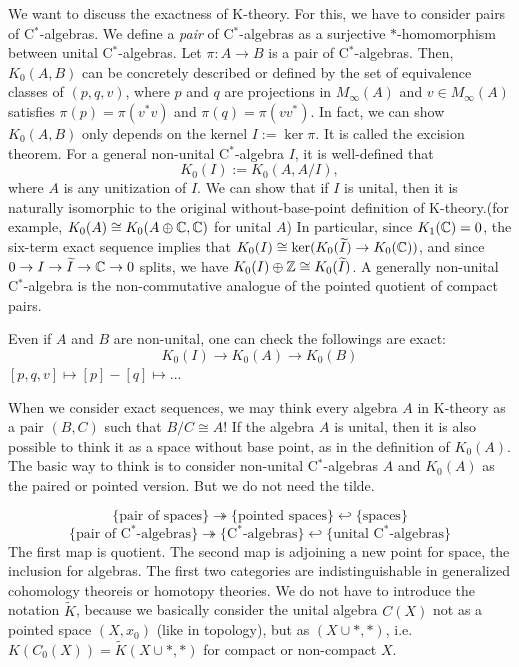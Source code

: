 \documentclass{../../large}
\begin{document}
\begin{prb}
We want to discuss the exactness of K-theory.
For this, we have to consider pairs of C$^*$-algebras.
We define a \emph{pair} of C$^*$-algebras as a surjective $*$-homomorphism between unital C$^*$-algebras.
Let $\pi:A\to B$ is a pair of C$^*$-algebras.
Then, $K_0(A,B)$ can be concretely described or defined by the set of equivalence classes of $(p,q,v)$, where $p$ and $q$ are projections in $M_\infty(A)$ and $v\in M_\infty(A)$ satisfies $\pi(p)=\pi(v^*v)$ and $\pi(q)=\pi(vv^*)$.
In fact, we can show $K_0(A,B)$ only depends on the kernel $I:=\ker\pi$.
It is called the excision theorem.
For a general non-unital C$^*$-algebra $I$, it is well-defined that
\[K_0(I):=K_0(A,A/I),\]
where $A$ is any unitization of $I$.
We can show that if $I$ is unital, then it is naturally isomorphic to the original without-base-point definition of K-theory.(for example, $K_0(A)\cong K_0(A\oplus\mathbb{C},\mathbb{C})$ for unital $A$)
In particular, since $K_1(\mathbb{C})=0$, the six-term exact sequence implies that $K_0(I)\cong\ker(K_0(\widetilde I)\to K_0(\mathbb{C}))$, and since $0\to I\to\widetilde I\to\mathbb{C}\to0$ splits, we have $K_0(I)\oplus\mathbb{Z}\cong K_0(\widetilde I)$.
A generally non-unital C$^*$-algebra is the non-commutative analogue of the pointed quotient of compact pairs.


Even if $A$ and $B$ are non-unital, one can check the followings are exact:
\[K_0(I)\to K_0(A)\to K_0(B)\]
$[p,q,v]\mapsto[p]-[q]\mapsto$...

When we consider exact sequences, we may think every algebra $A$ in K-theory as a pair $(B,C)$ such that $B/C\cong A$!
If the algebra $A$ is unital, then it is also possible to think it as a space without base point, as in the definition of $K_0(A)$.
The basic way to think is to consider non-unital C$^*$-algebras $A$ and $K_0(A)$ as the paired or pointed version.
But we do not need the tilde.

\[\{\text{pair of spaces}\}\twoheadrightarrow\{\text{pointed spaces}\}\hookleftarrow\{\text{spaces}\}\]
\[\{\text{pair of C$^*$-algebras}\}\twoheadrightarrow\{\text{C$^*$-algebras}\}\hookleftarrow\{\text{unital C$^*$-algebras}\}\]
The first map is quotient.
The second map is adjoining a new point for space, the inclusion for algebras.
The first two categories are indistinguishable in generalized cohomology theoreis or homotopy theories.
We do not have to introduce the notation $\tilde K$, because we basically consider the unital algebra $C(X)$ not as a pointed space $(X,x_0)$ (like in topology), but as $(X\cup*,*)$, i.e.~$K(C_0(X))=\tilde K(X\cup*,*)$ for compact or non-compact $X$.
\end{prb}
\end{document}
